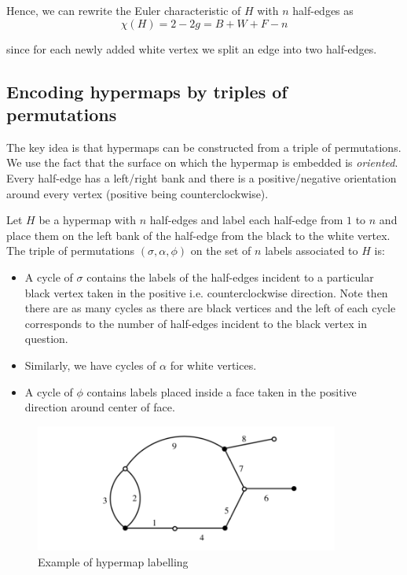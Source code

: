 \documentclass{article}
\theoremstyle{definition}
\begin{document}
Hence, we can rewrite the Euler characteristic of $H$ with $n$ half-edges as 
\begin{equation*}
    \chi(H) = 2-2g = B + W + F - n
\end{equation*}

since for each newly added white vertex we split an edge into two half-edges.

\subsection{Encoding hypermaps by triples of permutations}
The key idea is that hypermaps can be constructed from a triple of permutations. We use the fact that the surface on which the hypermap is embedded is \emph{oriented}. Every half-edge has a left/right bank and there is a positive/negative orientation around every vertex (positive being counterclockwise). 

Let $H$ be a hypermap with $n$ half-edges and label each half-edge from $1$ to $n$ and place them on the left bank of the half-edge from the black to the white vertex. The triple of permutations $(\sigma, \alpha, \phi)$ on the set of $n$ labels associated to $H$ is:
\begin{itemize}
    \item A cycle of $\sigma$ contains the labels of the half-edges incident to a particular black vertex taken in the positive i.e. counterclockwise direction. Note then there are as many cycles as there are black vertices and the left of each cycle corresponds to the number of half-edges incident to the black vertex in question. \item Similarly, we have cycles of $\alpha$ for white vertices.
    \item A cycle of $\phi$ contains labels placed inside a face taken in the positive direction around center of face.
\end{itemize}

\begin{figure}[H]
\centering
\includegraphics[width=10cm]{images/m8_triple_permutations_hypermap.png}
\caption{\small{Example of hypermap labelling}}
\label{img:m8_triple_permutations_hypermap}
\end{figure}
\end{document}
